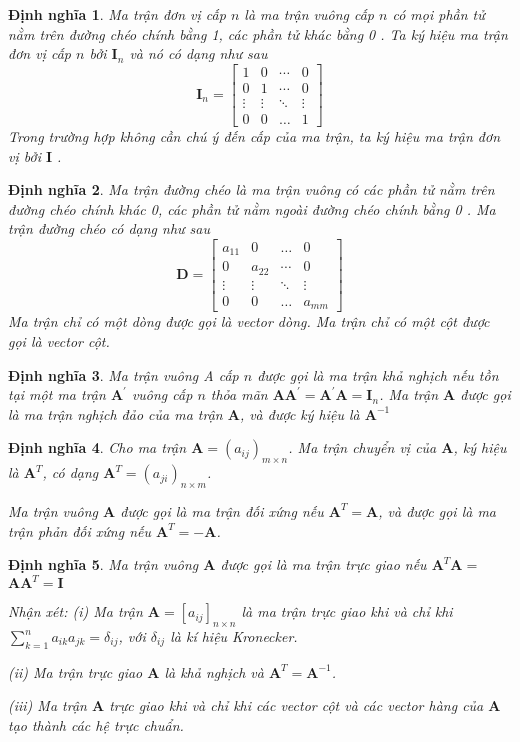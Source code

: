 \documentclass[12pt,a4paper,oneside]{report}
\newtheorem{dn}{Định nghĩa}[section]
\numberwithin{equation}{section}
\begin{document}
\begin{dn}\rm
	Ma trận đơn vị cấp $n$ là ma trận vuông cấp $n$ có mọi phần tử nằm trên đường chéo chính bằng 1, các phần tử khác bằng 0 . Ta ký hiệu ma trận đơn vị cấp $n$ bởi $\mathbf{I}_{n}$ và nó có dạng như sau
$$
\mathbf{I}_{n}=\left[\begin{array}{cccc}
	1 & 0 & \cdots & 0 \\
	0 & 1 & \cdots & 0 \\
	\vdots & \vdots & \ddots & \vdots \\
	0 & 0 & \ldots & 1
\end{array}\right]
$$
Trong trường hợp không cần chú ý đến cấp của ma trận, ta ký hiệu ma trận đơn vị bởi $\mathbf{I}$ .
\end{dn}
\begin{dn}\rm                     
Ma trận đường chéo là ma trận vuông có các phần tử nằm trên đường chéo chính khác 0, các phần tử nằm ngoài đường chéo chính bằng 0 . Ma trận đường chéo có dạng như sau
$$
\mathbf{D}=\left[\begin{array}{cccc}
	a_{11} & 0 & \ldots & 0 \\
	0 & a_{22} & \cdots & 0 \\
	\vdots & \vdots & \ddots & \vdots \\
	0 & 0 & \ldots & a_{m m}
\end{array}\right]
$$
\indent Ma trận chỉ có một dòng được gọi là vector dòng. Ma trận chỉ có một cột được gọi là vector cột.
\end{dn}
\begin{dn}\rm 
	Ma trận vuông A cấp $n$ được gọi là ma trận khả nghịch nếu tồn tại một ma trận $\mathbf{A}^{\prime}$ vuông cấp $n$ thỏa mãn $\mathbf{A} \mathbf{A}^{\prime}=\mathbf{A}^{\prime} \mathbf{A}=\mathbf{I}_{n}$. Ma trận $\mathbf{A}$ được gọi là ma trận nghịch đảo của ma trận $\mathbf{A}$, và được ký hiệu là $\mathbf{A}^{-1}$
\end{dn}
\begin{dn}\rm 
	Cho ma trận $\mathbf{A}=\left(a_{i j}\right)_{m \times n}$. Ma trận chuyển vị của $\mathbf{A}$, ký hiệu là $\mathbf{A}^{T}$, có dạng $\mathbf{A}^{T}=\left(a_{j i}\right)_{n \times m}$.
	
	Ma trận vuông $\mathbf{A}$ được gọi là ma trận đối xứng nếu $\mathbf{A}^{T}=\mathbf{A}$, và được gọi là ma trận phản đối xứng nếu $\mathbf{A}^{T}=-\mathbf{A}$.
\end{dn}
\begin{dn}\rm 
	Ma trận vuông $\mathbf{A}$ được gọi là ma trận trực giao nếu $\mathbf{A}^{T} \mathbf{A}=$ $\mathbf{A A}^{T}=\mathbf{I}$
	
	Nhận xét: (i) Ma trận $\mathbf{A}=\left[a_{i j}\right]_{n \times n}$ là ma trận trực giao khi và chỉ khi $\sum_{k=1}^{n} a_{i k} a_{j k}=\delta_{i j}$, với $\delta_{i j}$ là kí hiệu Kronecker.
	
	(ii) Ma trận trực giao $\mathbf{A}$ là khả nghịch và $\mathbf{A}^{T}=\mathbf{A}^{-1}$.
	
	(iii) Ma trận $\mathbf{A}$ trực giao khi và chỉ khi các vector cột và các vector hàng của $\mathbf{A}$ tạo thành các hệ trực chuẩn.
\end{dn}
\end{document}
